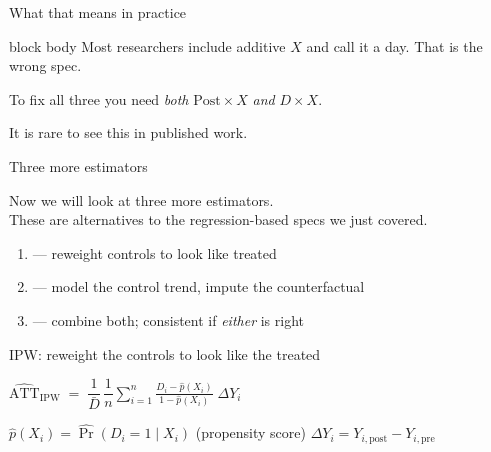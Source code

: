 \documentclass[aspectratio=169,11pt]{beamer}
\newcommand{\emphbox}[1]{%
  \begin{beamercolorbox}[rounded=true,sep=7pt,wd=\linewidth]{block body}%
    \small\color{slate} #1%
  \end{beamercolorbox}}
\begin{document}
\begin{frame}{What that means in practice}
\vspace{1.4em}
\emphbox{Most researchers include additive $X$ and call it a day. \;That is the wrong spec.
\vspace{0.5em}

To fix all three you need \textit{both} $\mathrm{Post}\times X$ \textit{and} $D\times X$.
\vspace{0.5em}

It is rare to see this in published work.}
\end{frame}




\begin{frame}{Three more estimators}
\vspace{0.8em}
\begin{center}
Now we will look at three more estimators.\\[0.5em]
These are alternatives to the regression-based specs we just covered.
\end{center}
\vspace{0.6em}
\begin{enumerate}\setlength\itemsep{0.5em}
  \item {} --- reweight controls to look like treated
  \item {} --- model the control trend, impute the counterfactual
  \item {} --- combine both; consistent if \textit{either} is right
\end{enumerate}
\end{frame}

\begin{frame}{IPW: reweight the controls to look like the treated}
\vspace{1.0em}
\begin{center}
\large
$\widehat{\mathrm{ATT}}_{\mathrm{IPW}}
  \;=\; \dfrac{1}{\bar{D}}\,\dfrac{1}{n}
        \displaystyle\sum_{i=1}^{n}
        \frac{D_i - \hat{p}(X_i)}{1 - \hat{p}(X_i)}
        \;\Delta Y_i$
\end{center}
\vspace{0.8em}
\begin{center}
\color{warmgray}\small
$\hat{p}(X_i) = \widehat{\Pr}(D_i=1\mid X_i)$ \quad (propensity score)
\qquad
$\Delta Y_i = Y_{i,\mathrm{post}} - Y_{i,\mathrm{pre}}$
\end{center}
\end{frame}
\end{document}
